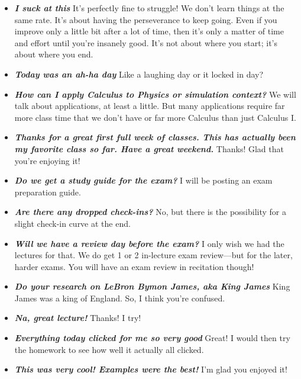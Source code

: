 \documentclass[11pt,letterpaper]{article}
\begin{document}
\begin{itemize}
\item {\bfseries\itshape I suck at this} It's perfectly fine to struggle! We don't learn things at the same rate. It's about having the perseverance to keep going. Even if you improve only a little bit after a lot of time, then it's only a matter of time and effort until you're insanely good. It's not about where you start; it's about where you end. 

\item {\bfseries\itshape Today was an ah-ha day} Like a laughing day or it locked in day?

\item {\bfseries\itshape How can I apply Calculus to Physics or simulation context?} We will talk about applications, at least a little. But many applications require far more class time that we don't have or far more Calculus than just Calculus I. 

\item {\bfseries\itshape Thanks for a great first full week of classes. This has actually been my favorite class so far. Have a great weekend.} Thanks! Glad that you're enjoying it!

\item {\bfseries\itshape Do we get a study guide for the exam?} I will be posting an exam preparation guide. 

\item {\bfseries\itshape Are there any dropped check-ins?} No, but there is the possibility for a slight check-in curve at the end. 

\item {\bfseries\itshape Will we have a review day before the exam?} I only wish we had the lectures for that. We do get 1 or 2 in-lecture exam review---but for the later, harder exams. You will have an exam review in recitation though!

\item {\bfseries\itshape Do your research on LeBron Bymon James, aka King James} King James was a king of England. So, I think you're confused. 

\item {\bfseries\itshape Na, great lecture!} Thanks! I try!

\item {\bfseries\itshape Everything today clicked for me so very good} Great! I would then try the homework to see how well it actually all clicked. 

\item {\bfseries\itshape This was very cool! Examples were the best!} I'm glad you enjoyed it!


\end{itemize}
\end{document}
